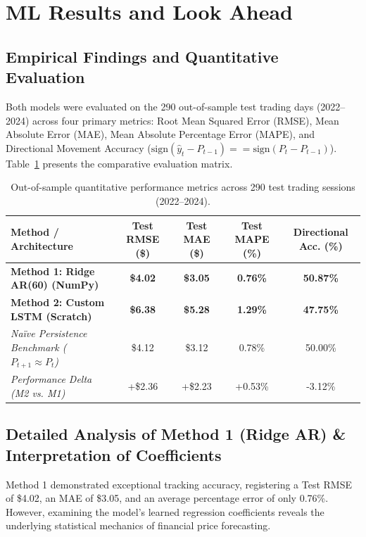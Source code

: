 \documentclass[11pt,letterpaper]{article}
\begin{document}
\newpage

\section{ML Results and Look Ahead}

\subsection{Empirical Findings and Quantitative Evaluation}
Both models were evaluated on the 290 out-of-sample test trading days (2022--2024) across four primary metrics: Root Mean Squared Error (RMSE), Mean Absolute Error (MAE), Mean Absolute Percentage Error (MAPE), and Directional Movement Accuracy ($\text{sign}(\hat{y}_{t} - P_{t-1}) == \text{sign}(P_t - P_{t-1})$). Table~\ref{tab:comparison} presents the comparative evaluation matrix.

\begin{table}[H]
\centering
\caption{Out-of-sample quantitative performance metrics across 290 test trading sessions (2022--2024).}
\label{tab:comparison}
\begin{tabular}{lcccc}
\toprule
\textbf{Method / Architecture} & \textbf{Test RMSE (\$)} & \textbf{Test MAE (\$)} & \textbf{Test MAPE (\%)} & \textbf{Directional Acc. (\%)} \\
\midrule
\textbf{Method 1: Ridge AR(60) (NumPy)} & \textbf{\$4.02} & \textbf{\$3.05} & \textbf{0.76\%} & \textbf{50.87\%} \\
\textbf{Method 2: Custom LSTM (Scratch)} & \textbf{\$6.38} & \textbf{\$5.28} & \textbf{1.29\%} & \textbf{47.75\%} \\
\midrule
\textit{Naïve Persistence Benchmark ($P_{t+1} \approx P_t$)} & \$4.12 & \$3.12 & 0.78\% & 50.00\% \\
\textit{Performance Delta (M2 vs. M1)} & +\$2.36 & +\$2.23 & +0.53\% & -3.12\% \\
\bottomrule
\end{tabular}
\end{table}

\subsection{Detailed Analysis of Method 1 (Ridge AR) \& Interpretation of Coefficients}
Method 1 demonstrated exceptional tracking accuracy, registering a Test RMSE of \$4.02, an MAE of \$3.05, and an average percentage error of only 0.76\%. However, examining the model's learned regression coefficients reveals the underlying statistical mechanics of financial price forecasting.
\end{document}
